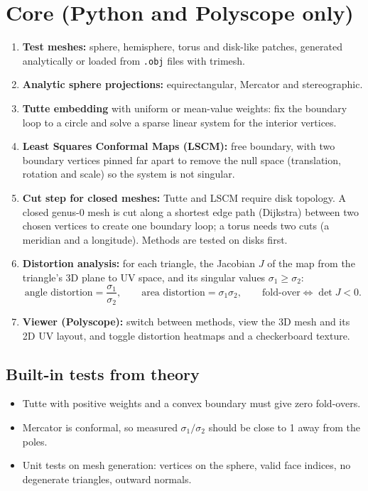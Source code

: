 \documentclass[11pt]{article}
\begin{document}
\section{Core (Python and Polyscope only)}
\begin{enumerate}
  \item \textbf{Test meshes:} sphere, hemisphere, torus and disk-like patches, generated analytically or loaded
        from \texttt{.obj} files with trimesh.
  \item \textbf{Analytic sphere projections:} equirectangular, Mercator and stereographic.
  \item \textbf{Tutte embedding} with uniform or mean-value weights: fix the boundary loop to a circle and solve
        a sparse linear system for the interior vertices.
  \item \textbf{Least Squares Conformal Maps (LSCM):} free boundary, with two boundary vertices pinned far
        apart to remove the null space (translation, rotation and scale) so the system is not singular.
  \item \textbf{Cut step for closed meshes:} Tutte and LSCM require disk topology. A closed genus-0 mesh is cut
        along a shortest edge path (Dijkstra) between two chosen vertices to create one boundary loop; a torus
        needs two cuts (a meridian and a longitude). Methods are tested on disks first.
  \item \textbf{Distortion analysis:} for each triangle, the Jacobian $J$ of the map from the triangle's 3D plane
        to UV space, and its singular values $\sigma_1 \ge \sigma_2$:
        \[
          \text{angle distortion} = \frac{\sigma_1}{\sigma_2}, \qquad
          \text{area distortion} = \sigma_1 \sigma_2, \qquad
          \text{fold-over} \iff \det J < 0 .
        \]
  \item \textbf{Viewer (Polyscope):} switch between methods, view the 3D mesh and its 2D UV layout, and toggle
        distortion heatmaps and a checkerboard texture.
\end{enumerate}

\subsection*{Built-in tests from theory}
\begin{itemize}
  \item Tutte with positive weights and a convex boundary must give zero fold-overs.
  \item Mercator is conformal, so measured $\sigma_1/\sigma_2$ should be close to 1 away from the poles.
  \item Unit tests on mesh generation: vertices on the sphere, valid face indices, no degenerate triangles,
        outward normals.
\end{itemize}
\end{document}
